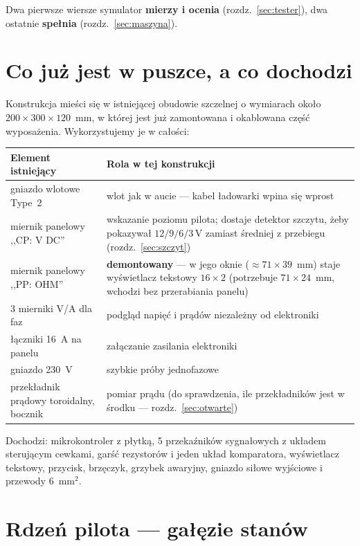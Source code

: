 \documentclass[a4paper,11pt]{article}
\newcommand{\volt}{\,\mathrm{V}}
\begin{document}
Dwa pierwsze wiersze symulator \textbf{mierzy i ocenia} (rozdz.~\ref{sec:tester}),
dwa ostatnie \textbf{spełnia} (rozdz.~\ref{sec:maszyna}).

\section{Co już jest w puszce, a co dochodzi}

Konstrukcja mieści się w istniejącej obudowie szczelnej o wymiarach około
$200\times300\times120$~mm, w której jest już zamontowana i okablowana część
wyposażenia. Wykorzystujemy je w całości:

\begin{center}
\begin{tabular}{p{5.2cm}p{10.0cm}}
\toprule
Element istniejący & Rola w tej konstrukcji \\
\midrule
gniazdo wlotowe Type~2 & wlot jak w aucie --- kabel ładowarki wpina się wprost \\
miernik panelowy ,,CP: V DC'' & wskazanie poziomu pilota; dostaje detektor
  szczytu, żeby pokazywał $12/9/6/3\volt$ zamiast średniej z przebiegu
  (rozdz.~\ref{sec:szczyt}) \\
miernik panelowy ,,PP: OHM'' & \textbf{demontowany} --- w jego oknie
  ($\approx 71\times39$~mm) staje wyświetlacz tekstowy $16\times2$
  (potrzebuje $71\times24$~mm, wchodzi bez przerabiania panelu) \\
3 mierniki V/A dla faz & podgląd napięć i prądów niezależny od elektroniki \\
łączniki 16~A na panelu & załączanie zasilania elektroniki \\
gniazdo 230~V & szybkie próby jednofazowe \\
przekładnik prądowy toroidalny, bocznik & pomiar prądu (do sprawdzenia, ile
  przekładników jest w środku --- rozdz.~\ref{sec:otwarte}) \\
\bottomrule
\end{tabular}
\end{center}

\noindent Dochodzi: mikrokontroler z płytką, 5 przekaźników sygnałowych z układem
sterującym cewkami, garść rezystorów i jeden układ komparatora, wyświetlacz
tekstowy, przycisk, brzęczyk, grzybek awaryjny, gniazdo siłowe wyjściowe i przewody
$6$~mm$^2$.

\section{Rdzeń pilota --- gałęzie stanów}
\end{document}
